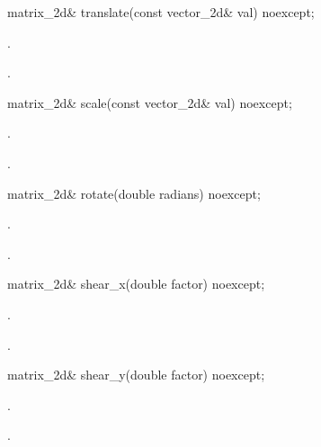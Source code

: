 \begin{itemdecl}
matrix_2d& translate(const vector_2d& val) noexcept;
\end{itemdecl}
\begin{itemdescr}
	\pnum
	\effects
	.
	
	\pnum
	\returns
	.
\end{itemdescr}

\begin{itemdecl}
matrix_2d& scale(const vector_2d& val) noexcept;
\end{itemdecl}
\begin{itemdescr}
	\pnum
	\effects
	.
	
	\pnum
	\returns
	.
\end{itemdescr}

\begin{itemdecl}
matrix_2d& rotate(double radians) noexcept;
\end{itemdecl}
\begin{itemdescr}
	\pnum
	\effects
	.
	
	\pnum
	\returns
	.
\end{itemdescr}

\begin{itemdecl}
matrix_2d& shear_x(double factor) noexcept;
\end{itemdecl}
\begin{itemdescr}
	\pnum
	\effects
	.
	
	\pnum
	\returns
	.
\end{itemdescr}

\begin{itemdecl}
matrix_2d& shear_y(double factor) noexcept;
\end{itemdecl}
\begin{itemdescr}
	\pnum
	\effects
	.
	
	\pnum
	\returns
	.
\end{itemdescr}

